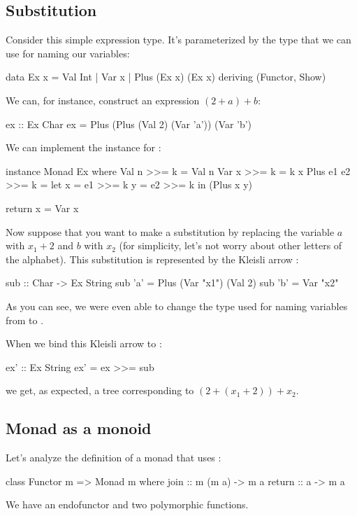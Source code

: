 \documentclass[DaoFP]{subfiles}
\begin{document}
\subsection{Substitution}

Consider this simple expression type. It's parameterized by the type  that we can use for naming our variables:
\begin{haskell}
data Ex x = Val Int 
          | Var x 
          | Plus (Ex x) (Ex x) 
 deriving (Functor, Show)
\end{haskell}
We can, for instance, construct an expression $(2 + a) + b$:
\begin{haskell}
ex :: Ex Char
ex = Plus (Plus (Val 2) (Var 'a')) (Var 'b')
\end{haskell}
We can implement the  instance for :
\begin{haskell}
instance Monad Ex where
  Val n >>= k = Val n
  Var x >>= k = k x
  Plus e1 e2 >>= k = 
    let x = e1 >>= k
        y = e2 >>= k
    in (Plus x y)
    
  return x = Var x 
\end{haskell}

Now suppose that you want to make a substitution by replacing the variable $a$ with $x_1 + 2$ and $b$ with $x_2$ (for simplicity, let's not worry about other letters of the alphabet). This substitution is represented by the Kleisli arrow :
\begin{haskell}
sub :: Char -> Ex String
sub 'a' = Plus (Var "x1") (Val 2)
sub 'b' = Var "x2"
\end{haskell}
As you can see, we were even able to change the type used for naming variables from  to .

When we bind this Kleisli arrow to :
\begin{haskell}
ex' :: Ex String
ex' = ex >>= sub
\end{haskell}
we get, as expected, a tree corresponding to $(2 + (x_1 + 2)) + x_2$.

\subsection{Monad as a monoid}

Let's analyze the definition of a monad that uses :
\begin{haskell}
class Functor m => Monad m where
  join :: m (m a) -> m a
  return :: a -> m a
\end{haskell}
We have an endofunctor  and two polymorphic functions. 
\end{document}
